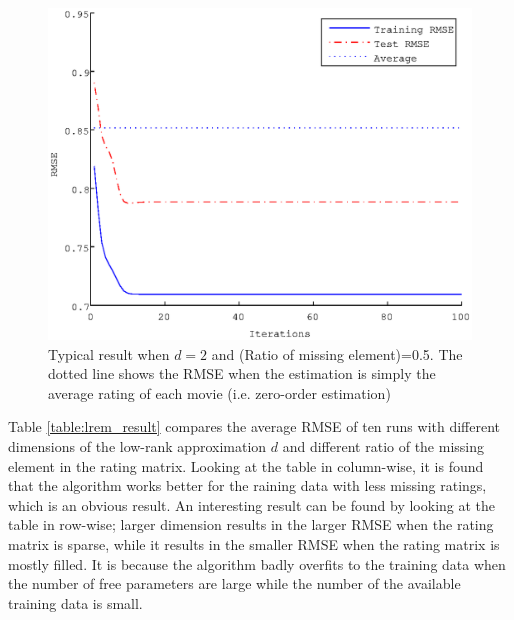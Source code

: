 \documentclass{article}
\begin{document}
\begin{figure}[h]
  \begin{center}
    \includegraphics[scale=0.7]{figure/lrem_typical_plot.eps}
  \end{center}
  \caption{Typical result when $d = 2$ and (Ratio of missing element)=0.5. The dotted line shows the RMSE when the estimation is simply the average rating of each movie (i.e. zero-order estimation)}
  \label{fig:lrem_typical_plot.eps}
\end{figure}

Table \ref{table:lrem_result} compares the average RMSE of ten runs with different dimensions of the low-rank approximation $d$ and different ratio of the missing element in the rating matrix. Looking at the table in column-wise, it is found that the algorithm works better for the raining data with less missing ratings, which is an obvious result. An interesting result can be found by looking at the table in row-wise; larger dimension results in the larger RMSE when the rating matrix is sparse, while it results in the smaller RMSE when the rating matrix is mostly filled. It is because the algorithm badly overfits to the training data when the number of free parameters are large while the number of the available training data is small. 
\end{document}
